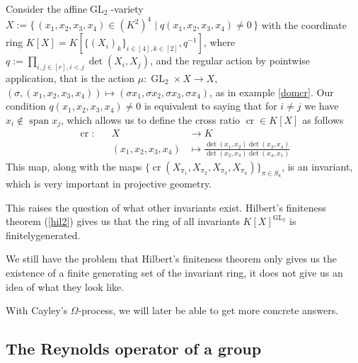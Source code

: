\begin{dexample}\label{crinv}
  Consider the affine\linebreak $\operatorname{GL}_2$-variety $X := \{\, (x_1,x_2,x_3,x_4) \in (K^2)^4 \mid q(x_1,x_2,x_3,x_4) \neq 0 \,\}$  with the coordinate ring $K[X] = K[\{(X_i)_k\}_{i \in [4], k \in [2]},q^{-1}]$, where $q := \prod_{i,j \in [r], i<j} \operatorname{det}(X_i,X_j)$, and the regular action by pointwise application, that is the action \linebreak$\mu \colon \operatorname{GL}_2 \times X \rightarrow X$, $(\sigma,(x_1,x_2,x_3,x_4)) \mapsto (\sigma x_1,\sigma x_2,\sigma x_3,\sigma x_4)$, as in example \ref{domcr}.
  Our condition $q(x_1,x_2,x_3,x_4) \neq 0$ is equivalent to saying that for $i\neq j$ we have $x_i \notin \operatorname{span}{x_j}$, which allows us to define the cross ratio $\operatorname{cr} \in K[X]$ as follows
  \begin{equation*}
    \begin{aligned}
      \operatorname{cr} \colon&&X&\longrightarrow K \\
      &&(x_1,x_2,x_3,x_4) &\longmapsto \frac{\operatorname{det}(x_1,x_2)\operatorname{det}(x_3,x_4)}{\operatorname{det}(x_2,x_3)\operatorname{det}(x_4,x_1)}
    \end{aligned}
  \end{equation*}
  This map, along with the maps $\{\operatorname{cr}(X_{\pi_1},X_{\pi_2},X_{\pi_3},X_{\pi_4})\}_{\pi \in S_4}$, is an invariant, which is very important in projective geometry.
  
  This raises the question of what other invariants exist.
  Hilbert's finiteness theorem (\ref{hil2}) gives us that the ring of all invariants $K[X]^{\operatorname{GL}_2}$ is finitely\linebreak generated.
\end{dexample}

We still have the problem that Hilbert's finiteness theorem only gives us the existence of a finite generating set of the invariant ring, it does not give us an idea of what they look like.

With Cayley's $\Omega$-process, we will later be able to get more concrete answers.

\subsection{The Reynolds operator of a group}



